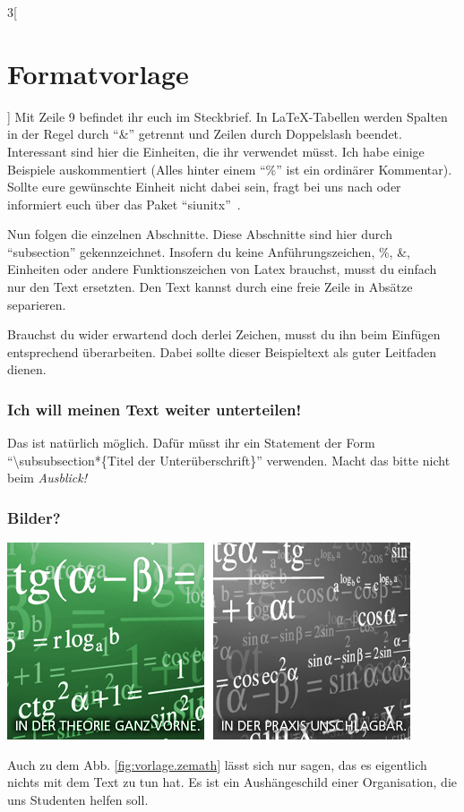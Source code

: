 \begin{multicols}{3}[\section{Formatvorlage}]
Mit Zeile 9 befindet ihr euch im Steckbrief. In \LaTeX-Tabellen werden Spalten in der Regel durch \enquote{\&} getrennt und Zeilen durch Doppelslash beendet. Interessant sind hier die Einheiten, die ihr verwendet müsst. Ich habe einige Beispiele auskommentiert (Alles hinter einem \enquote{\%} ist ein ordinärer Kommentar). Sollte eure gewünschte Einheit nicht dabei sein, fragt bei uns nach oder informiert euch über das Paket \enquote{siunitx}~\cite{vorlage.1}.

Nun folgen die einzelnen Abschnitte. Diese Abschnitte sind hier durch \enquote{subsection} gekennzeichnet. Insofern du keine Anführungszeichen, \%, \&, Einheiten oder andere Funktionszeichen von Latex brauchst, musst du einfach nur den Text ersetzten. Den Text kannst durch eine freie Zeile in Absätze separieren. 

Brauchst du wider erwartend doch derlei Zeichen, musst du ihn beim Einfügen entsprechend überarbeiten. Dabei sollte dieser Beispieltext als guter Leitfaden dienen.

\subsubsection*{Ich will meinen Text weiter unterteilen!}
Das ist natürlich möglich. Dafür müsst ihr ein Statement der Form \enquote{\textbackslash subsubsection*\{Titel der Unterüberschrift\}} verwenden. Macht das bitte nicht beim \textit{Ausblick!}

\subsubsection*{Bilder?}
\begin{Figure}
\includegraphics[width=\linewidth]{Kapitel/Vorlage/Grafiken/sg_ft_zemath.png}
\label{fig:vorlage.zemath}
\end{Figure}
Auch zu dem Abb. \ref{fig:vorlage.zemath} lässt sich nur sagen, das es eigentlich nichts mit dem Text zu tun hat. Es ist ein Aushängeschild einer Organisation, die uns Studenten helfen soll.


\end{multicols}
